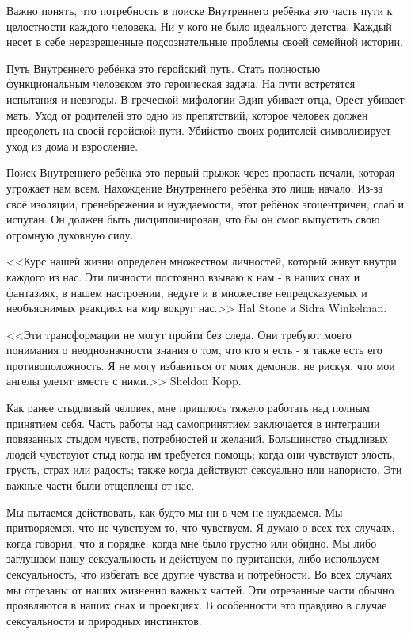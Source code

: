 \documentclass[10pt, fleqn]{article}
\begin{document}

Важно понять, что потребность в поиске Внутреннего ребёнка это часть пути к целостности каждого человека. Ни у кого не было идеального детства. Каждый несет в себе неразрешенные подсознательные проблемы своей семейной истории.

Путь Внутреннего ребёнка это геройский путь. Стать полностью функциональным человеком это героическая задача. На пути встретятся испытания и невзгоды. В греческой мифологии Эдип убивает отца, Орест убивает мать. Уход от родителей это одно из препятствий, которое человек должен преодолеть на своей геройской пути. Убийство своих родителей символизирует уход из дома и взросление.

Поиск Внутреннего ребёнка это первый прыжок через пропасть печали, которая угрожает нам всем. Нахождение Внутреннего ребёнка это лишь начало. Из-за своё изоляции, пренебрежения и нуждаемости, этот ребёнок эгоцентричен, слаб и испуган. Он должен быть дисциплинирован, что бы он смог выпустить свою огромную духовную силу.



<<Курс нашей жизни определен множеством личностей, который живут внутри каждого из нас. Эти личности постоянно взываю к нам - в наших снах и фантазиях, в нашем настроении, недуге и в множестве непредсказуемых и необъяснимых реакциях на мир вокруг нас.>> Hal Stone и Sidra Winkelman.

<<Эти трансформации не могут пройти без следа. Они требуют моего понимания о неоднозначности знания о том, что кто я есть - я также есть его противоположность. Я не могу избавиться от моих демонов, не рискуя, что мои ангелы улетят вместе с ними.>> Sheldon Kopp.

Как ранее стыдливый человек, мне пришлось тяжело работать над полным принятием себя. Часть работы над самопринятием заключается в интеграции повязанных стыдом чувств, потребностей и желаний. Большинство стыдливых людей чувствуют стыд когда им требуется помощь; когда они чувствуют злость, грусть, страх или радость; также когда действуют сексуально или напористо. Эти важные части были отщеплены от нас.

Мы пытаемся действовать, как будто мы ни в чем не нуждаемся. Мы притворяемся, что не чувствуем то, что чувствуем. Я думаю о всех тех случаях, когда говорил, что я порядке, когда мне было грустно или обидно. Мы либо заглушаем нашу сексуальность и действуем по пуритански, либо используем сексуальность, что избегать все другие чувства и потребности. Во всех случаях мы отрезаны от наших жизненно важных частей. Эти отрезанные части обычно проявляются в наших снах и проекциях. В особенности это правдиво в случае сексуальности и природных инстинктов.
\end{document}
